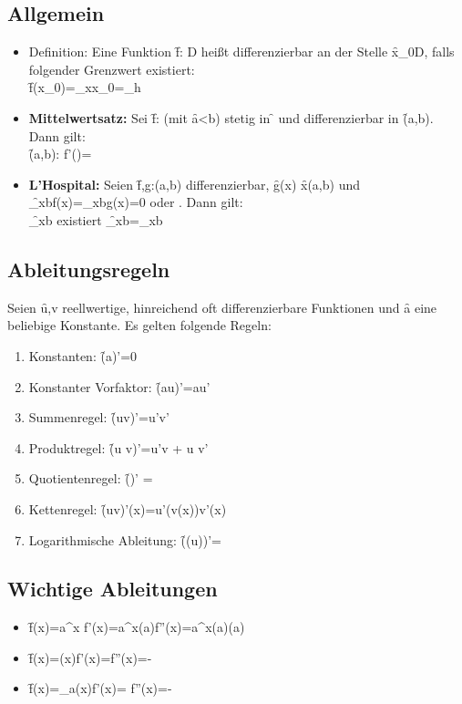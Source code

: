 \subsection{Allgemein}
\begin{itemize}
    \item Definition: Eine Funktion \f{f: D\to{}} heißt differenzierbar an der Stelle \f{x_0\in D}, falls folgender Grenzwert existiert:\\
    \f{f(x_0)=\lim_{x\to x_0}=\lim_{h}}
    \item \textbf{Mittelwertsatz:} Sei \f{f:\left[a,b\right]\to{}} (mit \f{a<b}) stetig in \f{\left[a,b\right]} und differenzierbar in \f{\left(a,b\right)}. Dann gilt:\\
    \f{\exists\gamma\in\left(a,b\right): f'(\gamma)=}
    \item \textbf{L'Hospital:} Seien \f{f,g:\left(a,b\right)\to{}} differenzierbar, \f{g(x)} \f{\forall x\in\left(a,b\right)} und \f{\lim_{x\to b}f(x)=\lim_{x\to b}g(x)=0 \textrm{ oder } \infty}. Dann gilt:\\
    \f{\lim_{x\to b}} existiert \f{\Longrightarrow \lim_{x\to b}=\lim_{x\to b}}
\end{itemize}


\subsection{Ableitungsregeln}
Seien \f{u,v} reellwertige, hinreichend oft differenzierbare Funktionen und \f{a\in {}} eine beliebige Konstante. Es gelten folgende Regeln:
\begin{enumerate}
    \item Konstanten: \f{(a)'=0}
    \item Konstanter Vorfaktor: \f{(a\cdot u)'=au'}
    \item Summenregel: \f{(u\pm v)'=u'\pm v'}
    \item Produktregel: \f{(u \cdot v)'=u'\cdot v + u \cdot v'}
    \item Quotientenregel: \f{()' = }
    \item Kettenregel: \f{(u\circ v)'(x)=u'(v(x))v'(x)}
    \item Logarithmische Ableitung: \f{(\ln(u))'=}
\end{enumerate}

\subsection{Wichtige Ableitungen}
\begin{itemize}
    \item \f{f(x)=a^x \longrightarrow f'(x)=a^x\cdot\ln(a)\longrightarrow f''(x)=a^x\cdot\ln(a)\cdot\ln(a)}
    \item \f{f(x)=\ln(x)\longrightarrow f'(x)=\longrightarrow f''(x)=-}
    \item \f{f(x)=\log_{a}(x)\longrightarrow f'(x)= \longrightarrow f''(x)=-}
\end{itemize}


